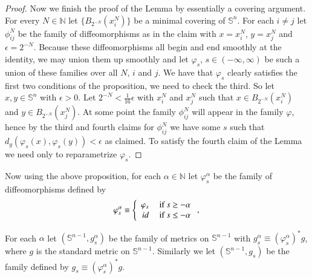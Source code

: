 \documentclass[11pt]{article}
\newcommand{\NN}{\mathds{N}}
\newcommand{\Sn}{\mathds{S}}
\begin{document}
\begin{proof}
Now we finish the proof of the Lemma by essentially a covering argument.  For every $N\in\NN$ let $\{B_{2^{-N}}(x^N_i)\}$ be a minimal covering of $\Sn^n$.  For each $i\neq j$ let $\phi^N_{ij}$ be the family of diffeomorphisms as in the claim with $x=x^N_i$, $y=x^N_j$ and $\epsilon=2^{-N}$.  Because these diffeomorphisms all begin and end smoothly at the identity, we may union them up smoothly and let $\varphi_s$, $s\in (-\infty,\infty)$ be such a union of these families over all $N$, $i$ and $j$.  We have that $\varphi_s$ clearly satisfies the first two conditions of the proposition, we need to check the third.  So let $x,y\in\Sn^n$ with $\epsilon>0$.  Let $2^{-N}<\frac{1}{16}\epsilon$ with $x^N_i$ and $x^N_j$ such that $x\in B_{2^{-N}}(x^N_i)$ and $y\in B_{2^{-N}}(x^N_j)$.  At some point the family $\phi^N_{ij}$ will appear in the family $\varphi$, hence by the third and fourth claims for $\phi^N_{ij}$ we have some $s$ such that $d_g(\varphi_s(x),\varphi_s(y))<\epsilon$ as claimed.  To satisfy the fourth claim of the Lemma we need only to reparametrize $\varphi_s$.
\end{proof}

Now using the above proposition, for each $\alpha\in\NN$ let $\varphi^\alpha_s$ be the family of diffeomorphisms defined by
\begin{align}
\varphi^\alpha_s\equiv \left\{ \begin{array}{rl}
  \varphi_s &\mbox{ if } s\geq -\alpha \notag\\
  id &\mbox{ if } s\leq -\alpha
       \end{array} \right. ,\,
\end{align}

For each $\alpha$ let $(\Sn^{n-1},g^\alpha_s)$ be the family of metrics on $\Sn^{n-1}$ with $g^\alpha_s\equiv(\varphi^\alpha_s)^*g$, where $g$ is the standard metric on $\Sn^{n-1}$.  Similarly we let $(\Sn^{n-1},g_s)$ be the family defined by $g_s\equiv(\varphi^\alpha_s)^*g$.
\end{document}
